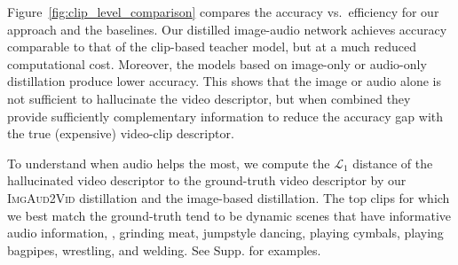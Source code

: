 Figure~\ref{fig:clip_level_comparison} compares the accuracy vs.~efficiency for our approach and the baselines. Our distilled image-audio network achieves accuracy comparable to that of the clip-based teacher model, but at a much reduced computational cost. Moreover, the models based on image-only or audio-only distillation produce lower accuracy. This shows that the image or audio alone is not sufficient to hallucinate the video descriptor, but when combined they provide sufficiently complementary information to reduce the accuracy gap with the true (expensive) video-clip descriptor. 

To understand when audio helps the most, we compute the $\mathcal{L}_1$ distance of the hallucinated video descriptor to the ground-truth video descriptor by our \textsc{ImgAud2Vid} distillation and the image-based distillation. The top clips for which we best match the ground-truth tend to be dynamic scenes that have informative audio information, \eg, grinding meat, jumpstyle dancing, playing cymbals, playing bagpipes, wrestling, and welding. See Supp. for examples.

\begin{table*}
\vspace{-1mm}
\caption{Video-level action recognition accuracy (in \%) on ActivityNet (\# classes: 200) and Mini-Sports1M (\# classes: 487). Kinetics-Sounds and UCF-101 consist of only short trimmed videos, so they are not applicable here. Our method consistently outperforms all baseline methods. Ours (sparse) uses only about 1/5 the computation cost of the last four baselines, while achieving large accuracy gains. See Table~\ref{Table:activitynet_sota} for more computation cost comparisons.
\vspace{-0.1in}
}
\vspace{-0.05in}
\label{Table:video_level_comparison}
\end{table*}

